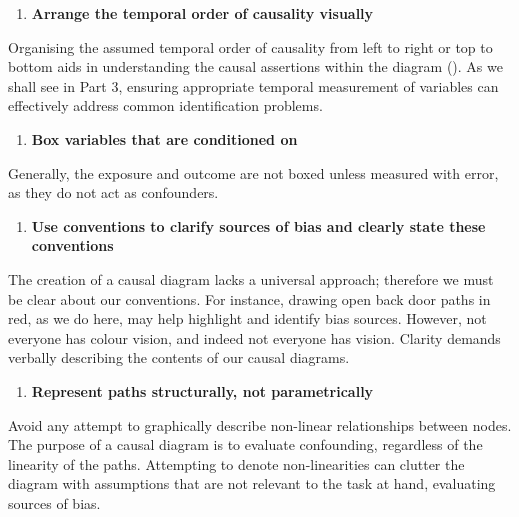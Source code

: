 \documentclass[
  singlecolumn]{article}
\providecommand{\tightlist}{%
  \setlength{\itemsep}{0pt}\setlength{\parskip}{0pt}}\usepackage{longtable,booktabs,array}
\begin{document}
\begin{enumerate}
\def\labelenumi{\arabic{enumi}.}
\setcounter{enumi}{3}
\tightlist
\item
  \textbf{Arrange the temporal order of causality visually}
\end{enumerate}

Organising the assumed temporal order of causality from left to right or
top to bottom aids in understanding the causal assertions within the
diagram (). As we shall see in
Part 3, ensuring appropriate temporal measurement of variables can
effectively address common identification problems.

\begin{enumerate}
\def\labelenumi{\arabic{enumi}.}
\setcounter{enumi}{4}
\tightlist
\item
  \textbf{Box variables that are conditioned on}
\end{enumerate}

Generally, the exposure and outcome are not boxed unless measured with
error, as they do not act as confounders.

\begin{enumerate}
\def\labelenumi{\arabic{enumi}.}
\setcounter{enumi}{5}
\tightlist
\item
  \textbf{Use conventions to clarify sources of bias and clearly state
  these conventions}
\end{enumerate}

The creation of a causal diagram lacks a universal approach; therefore
we must be clear about our conventions. For instance, drawing open back
door paths in red, as we do here, may help highlight and identify bias
sources. However, not everyone has colour vision, and indeed not
everyone has vision. Clarity demands verbally describing the contents of
our causal diagrams.

\begin{enumerate}
\def\labelenumi{\arabic{enumi}.}
\setcounter{enumi}{6}
\tightlist
\item
  \textbf{Represent paths structurally, not parametrically}
\end{enumerate}

Avoid any attempt to graphically describe non-linear relationships
between nodes. The purpose of a causal diagram is to evaluate
confounding, regardless of the linearity of the paths. Attempting to
denote non-linearities can clutter the diagram with assumptions that are
not relevant to the task at hand, evaluating sources of bias.
\end{document}
